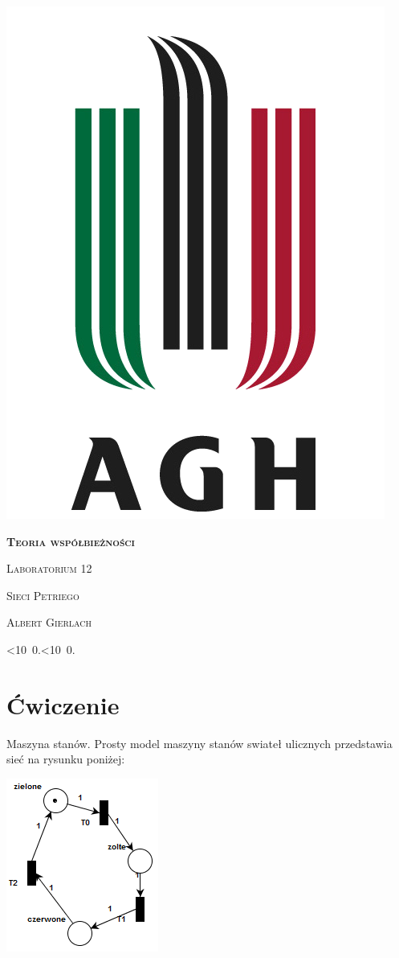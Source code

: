 \documentclass[12pt]{article}
\def\mydate{\leavevmode\hbox{\twodigits\day.\twodigits\month.\the\year}}
\def\twodigits#1{\ifnum#1<10 0\fi\the#1}
\begin{document}
\thispagestyle{empty}
\begin{center}
\begin{minipage}{0.75\linewidth}
    \centering
    \includegraphics[width=0.45\linewidth]{agh_logo2.png}
    \par
    \vspace{2cm}
    {\bfseries{\scshape{\Huge  Teoria współbieżności}}}
    \par
    \vspace{1.7cm}
    {\scshape{\Large Laboratorium 12}}
    \par
    \vspace{0.8cm}
    {\scshape{\Large Sieci Petriego}}
    \par
    \vspace{3cm}

    {\scshape{\Large Albert Gierlach}}\par
    \vspace{1cm}

    {\Large \mydate}
\end{minipage}
\end{center}
\clearpage



\section{Ćwiczenie}
Maszyna stanów. Prosty model maszyny stanów swiateł ulicznych przedstawia sieć na rysunku poniżej:
\begin{center}
\centering
    \includegraphics{cw1.png}
\end{center}
\end{document}
